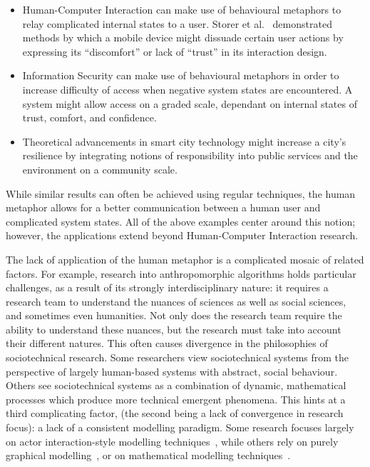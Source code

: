 \begin{itemize}
  \item Human-Computer Interaction can make use of behavioural metaphors to relay complicated internal states to a user. Storer et al.~\cite{storer_mobile_behaviour_poster} demonstrated methods by which a mobile device might dissuade certain user actions by expressing its ``discomfort'' or lack of ``trust'' in its interaction design.
  \item Information Security can make use of behavioural metaphors in order to increase difficulty of access when negative system states are encountered. A system might allow access on a graded scale, dependant on internal states of trust, comfort, and confidence.
  \item Theoretical advancements in smart city technology\cite{wallis_talk_about_x_talk} might increase a city's resilience by integrating notions of responsibility into public services and the environment on a community scale.\par
\end{itemize}

While similar results can often be achieved using regular techniques, the human metaphor allows for a better communication between a human user and complicated system states. All of the above examples center around this notion; however, the applications extend beyond Human-Computer Interaction research.\par

The lack of application of the human metaphor is a complicated mosaic of related factors. For example, research into anthropomorphic algorithms holds particular challenges, as a result of its strongly interdisciplinary nature: it requires a research team to understand the nuances of sciences as well as social sciences, and sometimes even humanities. Not only does the research team require the ability to understand these nuances, but the research must take into account their different natures. This often causes divergence in the philosophies of sociotechnical research. Some researchers view sociotechnical systems from the perspective of largely human-based systems with abstract, social behaviour. Others see sociotechnical systems as a combination of dynamic, mathematical processes which produce more technical emergent phenomena. This hints at a third complicating factor, (the second being a lack of convergence in research focus): a lack of a consistent modelling paradigm. Some research focuses largely on actor interaction-style modelling techniques~\cite{baxter2011socio}, while others rely on purely graphical modelling~\cite{ObashiMethodology}, or on mathematical modelling techniques~\cite{vespignani2012modelling}. \par

